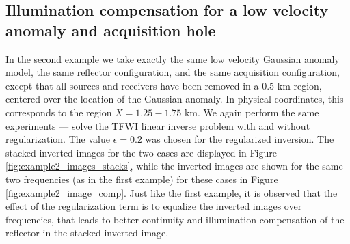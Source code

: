 \subsection{Illumination compensation for a low velocity anomaly and acquisition hole}

\vspace*{-0.1cm}
In the second example we take exactly the same low velocity Gaussian anomaly model, the same reflector configuration, and the same acquisition configuration, except that all sources and receivers have been removed in a 0.5 km region, centered over the location of the Gaussian anomaly. In physical coordinates, this corresponds to the region $X = 1.25 - 1.75$ km. We again perform the same experiments --- solve the TFWI linear inverse problem with and without regularization. The value $\epsilon=0.2$ was chosen for the regularized inversion. The stacked inverted images for the two cases are displayed in Figure \ref{fig:example2_images_stacks}, while the inverted images are shown for the same two frequencies (as in the first example) for these cases in Figure \ref{fig:example2_image_comp}. Just like the first example, it is observed that the effect of the regularization term is to equalize the inverted images over frequencies, that leads to better continuity and illumination compensation of the reflector in the stacked inverted image.

\vspace*{-0.2cm}

\vspace*{-0.2cm}
